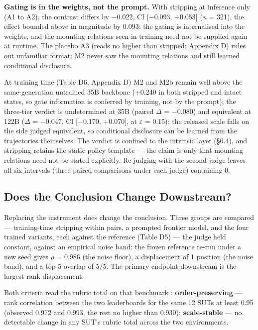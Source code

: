 \documentclass[letterpaper]{article}
\begin{document}
\textbf{Gating is in the weights, not the prompt.} With stripping at inference only (A1 to A2), the contrast differs by $-$0.022, CI [$-$0.093, +0.053] (\textit{n} = 321), the effect bounded above in magnitude by 0.093: the gating is internalised into the weights, and the mounting relations seen in training need not be supplied again at runtime. The placebo A3 (reads no higher than stripped; Appendix D) rules out unfamiliar format; M2 never saw the mounting relations and still learned conditional disclosure.

At training time (Table D6, Appendix D) M2 and M2b remain well above the same-generation untrained 35B backbone (+0.240 in both stripped and intact states, so gate information is conferred by training, not by the prompt); the three-tier verdict is undetermined at 35B (paired $\Delta$ = $-$0.080) and equivalent at 122B ($\Delta$ = $-$0.047, CI [$-$0.170, +0.070], at $\varepsilon$ = 0.15): the released scale falls on the side judged equivalent, so conditional disclosure can be learned from the trajectories themselves. The verdict is confined to the intrinsic layer (\S{}6.4), and stripping retains the static policy template --- the claim is only that mounting relations need not be stated explicitly. Re-judging with the second judge leaves all six intervals (three paired comparisons under each judge) containing 0.



\subsection{Does the Conclusion Change Downstream?}

Replacing the instrument does change the conclusion. Three groups are compared --- training-time stripping within pairs, a prompted frontier model, and the four trained variants, each against the reference (Table D5) --- the judge held constant, against an empirical noise band: the frozen reference re-run under a new seed gives $\rho$ = 0.986 (the noise floor), a displacement of 1 position (the noise band), and a top-5 overlap of 5/5. The primary endpoint downstream is the largest rank displacement.

Both criteria read the rubric total on that benchmark \citep{companionbench}: \textbf{order-preserving} --- rank correlation between the two leaderboards for the same 12 SUTs at least 0.95 (observed 0.972 and 0.993, the rest no higher than 0.930); \textbf{scale-stable} --- no detectable change in any SUT's rubric total across the two environments.
\end{document}
